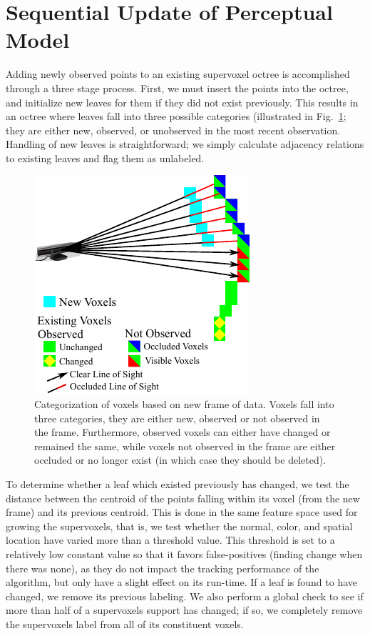 \section{Sequential Update of Perceptual Model}
Adding newly observed points to an existing supervoxel octree is accomplished through a three stage process. First, we must insert the points into the octree, and initialize new leaves for them if they did not exist previously. This results in an octree where leaves fall into three possible categories (illustrated in Fig.~\ref{fig:VoxelVisibility}; they are either new, observed, or unobserved in the most recent observation. Handling of new leaves is straightforward; we simply calculate adjacency relations to existing leaves and flag them as unlabeled. 
\begin{figure}[tb]
  \centering
  \includegraphics[scale=1.2]{figures/IROS2013/VoxelVisibility.pdf}
  \caption[Voxel Visibility]{Categorization of voxels based on new frame of data. Voxels fall into three categories, they are either new, observed or not observed in the frame. Furthermore, observed voxels can either have changed or remained the same, while voxels not observed in the frame are either occluded or no longer exist (in which case they should be deleted).}
  \label{fig:VoxelVisibility}
\end{figure}

To determine whether a leaf which existed previously has changed, we test the distance between the centroid of the points falling within its voxel (from the new frame) and its previous centroid. This is done in the same feature space used for growing the supervoxels, that is, we test whether the normal, color, and spatial location have varied more than a threshold value. This threshold is set to a relatively low constant value so that it favors false-positives (finding change when there was none), as they do not impact the tracking performance of the algorithm, but only have a slight effect on its run-time.  If a leaf is found to have changed, we remove its previous labeling. We also perform a global check to see if more than half of a supervoxels support has changed; if so, we completely remove the supervoxels label from all of its constituent voxels. 

